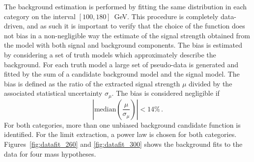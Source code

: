 The background estimation is performed by fitting the same distribution in each category on the interval
$[100, 180]$~GeV. This procedure is completely data-driven, and as such it is important
to verify that the choice of the function does not bias in a non-negligible way the
estimate of the signal
strength obtained from the model with both signal and background components.
The bias is estimated by considering a set of truth models which approximately describe the background.
For each truth model a large set of pseudo-data is generated and fitted by the sum of a candidate
background model and the signal model. The bias is defined as the ratio of the extracted signal strength
$\mu$ divided by the associated statistical uncertainty $\sigma_\mu$.
The bias is considered negligible if
\begin{equation}
\left|\text{median}\left(\frac{\mu}{\sigma_\mu}\right)\right| < 14\% \,.
\end{equation}
For both categories, more than one unbiased background candidate function is identified.
For the limit extraction,
a power law is chosen for both categories. Figures~\ref{fig:datafit_260} and \ref{fig:datafit_300}
shows the background fits to the data for four mass hypotheses.


